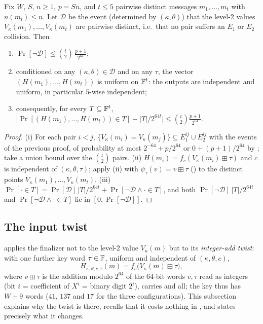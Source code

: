 \begin{theorem}\label{thm:ph:kwise}
Fix $W$, $S$, $n\ge1$, $p=Sn$, and $t\le5$ pairwise distinct messages
$m_1,\dots,m_t$ with $n(m_i)\le n$.  Let $\mathcal D$ be the event
(determined by $(\kappa,\theta)$) that the level-2 values
$V_\kappa(m_1),\dots,V_\kappa(m_t)$ are pairwise distinct, i.e.\ that no pair
suffers an $E_1$ or $E_2$ collision.  Then
\begin{enumerate}[label=(\roman*)]
\item $\Pr[\neg\mathcal D]\le\binom t2\,\frac{p+1}{2^{64}}$;
\item conditioned on any $(\kappa,\theta)\in\mathcal D$ and on any $\tau$,
      the vector $(H(m_1),\dots,H(m_t))$ is uniform on $\mathbb{F}^t$: the outputs
      are independent and uniform, in particular $5$-wise independent;
\item consequently, for every $T\subseteq\mathbb{F}^t$,
      $\bigl|\Pr[(H(m_1),\dots,H(m_t))\in T]-|T|/2^{64t}\bigr|\le\binom t2\frac{p+1}{2^{64}}$.
\end{enumerate}
\end{theorem}
\begin{proof}
(i) For each pair $i<j$, $\{V_\kappa(m_i)=V_\kappa(m_j)\}\subseteq E_1^{ij}\cup E_2^{ij}$
with the events of the previous proof, of probability at most
$2^{-64}+p/2^{64}$ or $0+(p+1)/2^{64}$ by ;
take a union bound over the $\binom t2$ pairs.
(ii) $H(m_i)=f_c(V_\kappa(m_i)\boxplus\tau)$ and $c$ is independent of
$(\kappa,\theta,\tau)$; apply (ii) with
$\psi_\tau(v)=v\boxplus\tau$ () to the distinct points
$V_\kappa(m_1),\dots,V_\kappa(m_t)$.
(iii) $\Pr[\cdot\in T]=\Pr[\mathcal D]\,|T|/2^{64t}+\Pr[\neg\mathcal D\wedge\cdot\in T]$,
and both $\Pr[\neg\mathcal D]\,|T|/2^{64t}$ and $\Pr[\neg\mathcal D\wedge\cdot\in T]$ lie in $[0,\Pr[\neg\mathcal D]]$.
\end{proof}

\subsection{The input twist}
\label{sec:ph:twist}

 applies the finalizer not to the level-2 value
$V_\kappa(m)$ but to its \emph{integer-add twist}: with one further key word
$\tau\in\mathbb{F}$, uniform and independent of $(\kappa,\theta,c)$,
\begin{equation}\label{eq:ph:twist-def}
  H_{\kappa,\theta,c,\tau}(m)=f_c\bigl(V_\kappa(m)\boxplus\tau\bigr),
\end{equation}
where $v\boxplus\tau$ is the addition modulo $2^{64}$ of the $64$-bit words
$v,\tau$ read as integers (bit $i$ = coefficient of $X^i$ = binary digit
$2^i$), carries and all; the key thus has $W+9$ words ($41$, $137$ and $17$
for the three configurations).  This subsection explains why the twist is
there, recalls that it costs nothing in
, and states precisely what it changes.

